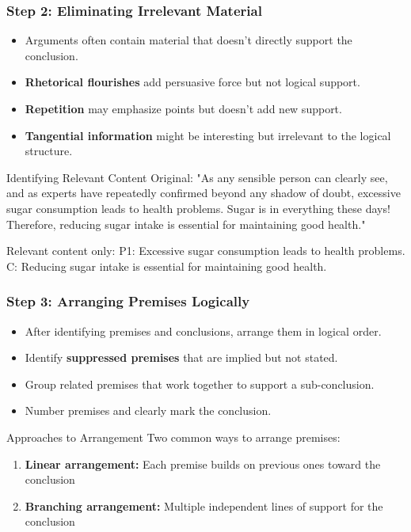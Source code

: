 \documentclass{beamer}
\begin{document}
\begin{frame}
    \frametitle{Step 2: Eliminating Irrelevant Material}
    \begin{itemize}
        \item Arguments often contain material that doesn't directly support the conclusion.
        \item \textbf{Rhetorical flourishes} add persuasive force but not logical support.
        \item \textbf{Repetition} may emphasize points but doesn't add new support.
        \item \textbf{Tangential information} might be interesting but irrelevant to the logical structure.
    \end{itemize}
    
    \begin{exampleblock}{Identifying Relevant Content}
        Original: "As any sensible person can clearly see, and as experts have repeatedly confirmed beyond any shadow of doubt, excessive sugar consumption leads to health problems. Sugar is in everything these days! Therefore, reducing sugar intake is essential for maintaining good health."
        
        Relevant content only:
        P1: Excessive sugar consumption leads to health problems.
        C: Reducing sugar intake is essential for maintaining good health.
    \end{exampleblock}
\end{frame}

\begin{frame}
    \frametitle{Step 3: Arranging Premises Logically}
    \begin{itemize}
        \item After identifying premises and conclusions, arrange them in logical order.
        \item Identify \textbf{suppressed premises} that are implied but not stated.
        \item Group related premises that work together to support a sub-conclusion.
        \item Number premises and clearly mark the conclusion.
    \end{itemize}
    
    \begin{block}{Approaches to Arrangement}
        Two common ways to arrange premises:
        \begin{enumerate}
            \item \textbf{Linear arrangement:} Each premise builds on previous ones toward the conclusion
            \item \textbf{Branching arrangement:} Multiple independent lines of support for the conclusion
        \end{enumerate}
    \end{block}
\end{frame}
\end{document}
